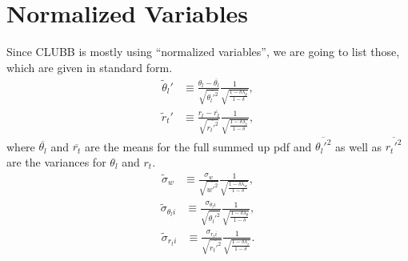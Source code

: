 \section{Normalized Variables}\label{sec:normvars}

Since \gls{CLUBB} is mostly using \enquote{normalized variables},
we are going to list those, which are given in standard form.
\begin{align}
    \tilde{\theta}_l'
    &\equiv \frac{\theta_l - \overline{\theta_l}}{\sqrt{\overline{\theta_l'^2}}}\frac{1}{\sqrt{\frac{1 - \delta \lambda_\theta}{1 - \delta}}}, \label{eq:theta_l_prime_tilde}
\end{align}
\begin{align}
    \tilde{r}_t'
    &\equiv \frac{r_t - \overline{r_t}}{\sqrt{\overline{r_t'^2}}}\frac{1}{\sqrt{\frac{1 - \delta \lambda_r}{1 - \delta}}}, \label{eq:r_t_prime_tilde}
\end{align}
where $\overline{\theta_l}$ and $\overline{r_t}$ are the means for the full summed up \gls{pdf}
and $\overline{\theta_l'^2}$ as well as $\overline{r_t'^2}$ are the variances for $\theta_l$ and $r_t$.
\begin{align}
    \tilde{\sigma}_w
    &\equiv \frac{\sigma_w}{\sqrt{\overline{w'^2}}}
    \frac{1}{\sqrt{\frac{1-\delta\lambda_w}{1-\delta}}}, \label{eq:sigma_w_tilde}
\end{align}
\begin{align}
    \tilde{\sigma}_{\theta_l i}
    &\equiv \frac{\sigma_{\theta_l i}}{\sqrt{\overline{\theta_l'^2}}}
    \frac{1}{\sqrt{\frac{1-\delta\lambda_\theta}{1-\delta}}}, \label{eq:sigma_theta_l_i_tilde}
\end{align}
\begin{align}
    \tilde{\sigma}_{r_t i}
    &\equiv \frac{\sigma_{r_t i}}{\sqrt{\overline{r_t'^2}}}
    \frac{1}{\sqrt{\frac{1-\delta\lambda_r}{1-\delta}}}. \label{eq:sigma_r_t_i_tilde}
\end{align}